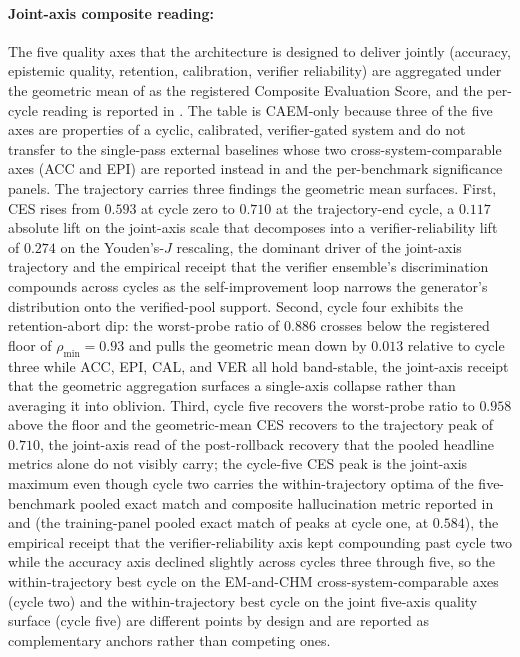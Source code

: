 \paragraph{Joint-axis composite reading:} The five quality axes that the architecture is designed to deliver jointly (accuracy, epistemic quality, retention, calibration, verifier reliability) are aggregated under the geometric mean of  as the registered Composite Evaluation Score, and the per-cycle reading is reported in . The table is CAEM-only because three of the five axes are properties of a cyclic, calibrated, verifier-gated system and do not transfer to the single-pass external baselines whose two cross-system-comparable axes (ACC and EPI) are reported instead in  and the per-benchmark significance panels. The trajectory carries three findings the geometric mean surfaces. First, CES rises from $0.593$ at cycle zero to $0.710$ at the trajectory-end cycle, a $0.117$ absolute lift on the joint-axis scale that decomposes into a verifier-reliability lift of $0.274$ on the Youden's-$J$ rescaling, the dominant driver of the joint-axis trajectory and the empirical receipt that the verifier ensemble's discrimination compounds across cycles as the self-improvement loop narrows the generator's distribution onto the verified-pool support. Second, cycle four exhibits the retention-abort dip: the worst-probe ratio of $0.886$ crosses below the registered floor of $\rho_{\min} = 0.93$ and pulls the geometric mean down by $0.013$ relative to cycle three while ACC, EPI, CAL, and VER all hold band-stable, the joint-axis receipt that the geometric aggregation surfaces a single-axis collapse rather than averaging it into oblivion. Third, cycle five recovers the worst-probe ratio to $0.958$ above the floor and the geometric-mean CES recovers to the trajectory peak of $0.710$, the joint-axis read of the post-rollback recovery that the pooled headline metrics alone do not visibly carry; the cycle-five CES peak is the joint-axis maximum even though cycle two carries the within-trajectory optima of the five-benchmark pooled exact match and composite hallucination metric reported in  and  (the training-panel pooled exact match of  peaks at cycle one, at $0.584$), the empirical receipt that the verifier-reliability axis kept compounding past cycle two while the accuracy axis declined slightly across cycles three through five, so the within-trajectory best cycle on the EM-and-CHM cross-system-comparable axes (cycle two) and the within-trajectory best cycle on the joint five-axis quality surface (cycle five) are different points by design and are reported as complementary anchors rather than competing ones.

